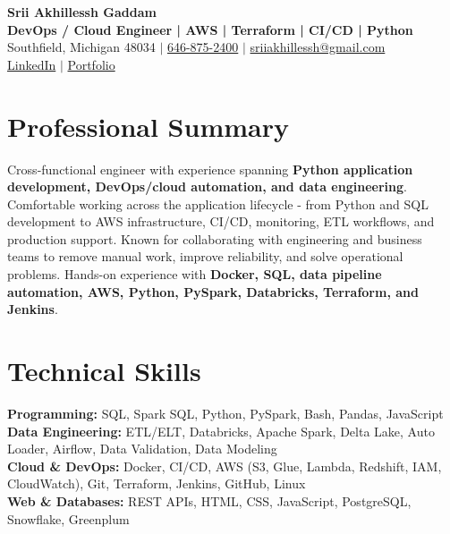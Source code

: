 \documentclass[letterpaper,10pt]{article}
\begin{document}
\fontsize{9.35pt}{10.45pt}\selectfont

\begin{center}
    {\LARGE \textbf{Srii Akhillessh Gaddam}} \\[-1pt]
    \textbf{DevOps / Cloud Engineer | AWS | Terraform | CI/CD | Python} \\[2pt]
    Southfield, Michigan 48034 $|$
    \href{tel:6468752400}{646-875-2400} $|$
    \href{mailto:sriiakhillessh@gmail.com}{sriiakhillessh@gmail.com} \\[1pt]
    \href{https://www.linkedin.com/in/srii-akhiilessh-gaddam-b48668191/}{LinkedIn} $|$
    \href{https://sriiakhillesshg.github.io/portfolio/}{Portfolio}
\end{center}
\vspace{-8pt}

\section{Professional Summary}
\small{Cross-functional engineer with experience spanning \textbf{Python application development, DevOps/cloud automation, and data engineering}. Comfortable working across the application lifecycle - from Python and SQL development to AWS infrastructure, CI/CD, monitoring, ETL workflows, and production support. Known for collaborating with engineering and business teams to remove manual work, improve reliability, and solve operational problems. Hands-on experience with \textbf{Docker, SQL, data pipeline automation, AWS, Python, PySpark, Databricks, Terraform, and Jenkins}.}

\section{Technical Skills}
\small{
\textbf{Programming:} SQL, Spark SQL, Python, PySpark, Bash, Pandas, JavaScript \\
\textbf{Data Engineering:} ETL/ELT, Databricks, Apache Spark, Delta Lake, Auto Loader, Airflow, Data Validation, Data Modeling \\
\textbf{Cloud \& DevOps:} Docker, CI/CD, AWS (S3, Glue, Lambda, Redshift, IAM, CloudWatch), Git, Terraform, Jenkins, GitHub, Linux \\
\textbf{Web \& Databases:} REST APIs, HTML, CSS, JavaScript, PostgreSQL, Snowflake, Greenplum
}
\end{document}
